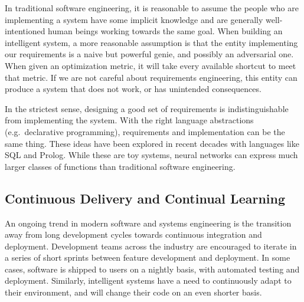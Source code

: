 \documentclass[12pt,initial,twoside,maitrise]{dms}
\numberwithin{equation}{section}
\numberwithin{table}{chapter}
\numberwithin{figure}{chapter}
\begin{document}
In traditional software engineering, it is reasonable to assume the people who are implementing a system have some implicit knowledge and are generally well-intentioned human beings working towards the same goal. When building an intelligent system, a more reasonable assumption is that the entity implementing our requirements is a naive but powerful genie, and possibly an adversarial one. When given an optimization metric, it will take every available shortcut to meet that metric. If we are not careful about requirements engineering, this entity can produce a system that does not work, or has unintended consequences.

In the strictest sense, designing a good set of requirements is indistinguishable from implementing the system. With the right language abstractions (e.g.\ declarative programming), requirements and implementation can be the same thing. These ideas have been explored in recent decades with languages like SQL and Prolog. While these are toy systems, neural networks can express much larger classes of functions than traditional software engineering.

\subsection{Continuous Delivery and Continual Learning}

An ongoing trend in modern software and systems engineering is the transition away from long development cycles towards continuous integration and deployment. Development teams across the industry are encouraged to iterate in a series of short sprints between feature development and deployment. In some cases, software is shipped to users on a nightly basis, with automated testing and deployment. Similarly, intelligent systems have a need to continuously adapt to their environment, and will change their code on an even shorter basis.



%
%



\end{document}
